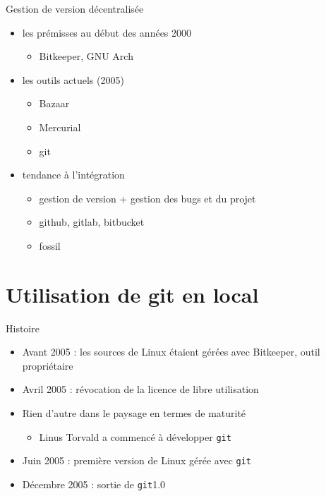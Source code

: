 \begin{frame}{%
\protect\hypertarget{gestion-de-version-duxe9centralisuxe9e}{%
Gestion de version décentralisée}}

\begin{itemize}
\tightlist
\item
  les prémisses au début des années 2000

  \begin{itemize}
  \tightlist
  \item
    Bitkeeper, GNU Arch
  \end{itemize}
\item
  les outils actuels (2005)

  \begin{itemize}
  \tightlist
  \item
    Bazaar
  \item
    Mercurial
  \item
    git
  \end{itemize}
\item
  tendance à l’intégration

  \begin{itemize}
  \tightlist
  \item
    gestion de version + gestion des bugs et du projet
  \item
    github, gitlab, bitbucket
  \item
    fossil
  \end{itemize}
\end{itemize}

\end{frame}

\hypertarget{utilisation-de-git-en-local}{%
\section{Utilisation de git en
local}\label{utilisation-de-git-en-local}}

\begin{frame}[fragile]{%
\protect\hypertarget{histoire}{%
Histoire}}

\begin{itemize}
\tightlist
\item
  Avant 2005 : les sources de Linux étaient gérées avec Bitkeeper, outil
  propriétaire
\item
  Avril 2005 : révocation de la licence de libre utilisation
\item
  Rien d’autre dans le paysage en termes de maturité

  \begin{itemize}
  \tightlist
  \item
    Linus Torvald a commencé à développer \texttt{git}
  \end{itemize}
\item
  Juin 2005 : première version de Linux gérée avec \texttt{git}
\item
  Décembre 2005 : sortie de \texttt{git}1.0
\end{itemize}

\end{frame}

